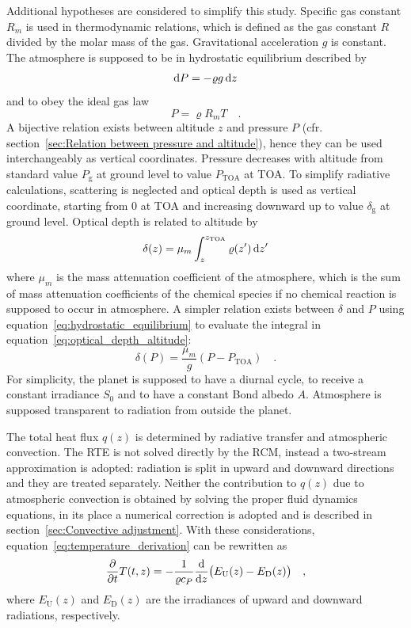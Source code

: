 \documentclass[a4paper,10pt,twocolumn,\classoptions]{article}
\newcommand{\zTOA}{z_\text{TOA}}
\newcommand{\PTOA}{P_\text{TOA}}
\begin{document}
Additional hypotheses are considered to simplify this study.
Specific gas constant $R_m$ is used in thermodynamic relations, which is defined as the gas constant $R$ divided by the molar mass of the gas.
Gravitational acceleration $g$ is constant.
The atmosphere is supposed to be in hydrostatic equilibrium described by
\begin{equation}
  \label{eq:hydrostatic_equilibrium}
  \odif{P} = - \varrho g \odif{z}
\end{equation}
and to obey the ideal gas law
\begin{equation}
  \label{eq:ideal_gas_law}
  P = \varrho R_m T
  \quad .
\end{equation}
A bijective relation exists between altitude $z$ and pressure $P$ (cfr. section~\ref{sec:Relation between pressure and altitude}), hence they can be used interchangeably as vertical coordinates. Pressure decreases with altitude from standard value $P_\text{g}$ at ground level to value $\PTOA$ at TOA.
To simplify radiative calculations, scattering is neglected and optical depth is used as vertical coordinate, starting from \num{0} at TOA and increasing downward up to value $\delta_\text{g}$ at ground level. Optical depth is related to altitude by
\begin{equation}
  \label{eq:optical_depth_altitude}
  \delta(z) = \mu_m \int_{z}^{\zTOA} \varrho(z') \odif{z'}
\end{equation}
where $\mu_m$ is the mass attenuation coefficient of the atmosphere, which is the sum of mass attenuation coefficients of the chemical species if no chemical reaction is supposed to occur in atmosphere. A simpler relation exists between $\delta$ and $P$ using equation~\eqref{eq:hydrostatic_equilibrium} to evaluate the integral in equation~\eqref{eq:optical_depth_altitude}:
\begin{equation}
  \label{eq:optical_depth_pressure}
  \delta(P) = \frac{\mu_m}{g} (P - \PTOA)
  \quad .
\end{equation}
For simplicity, the planet is supposed to have a diurnal cycle, to receive a constant irradiance $S_0$ and to have a constant Bond albedo $A$.
Atmosphere is supposed transparent to radiation from outside the planet.

The total heat flux $q(z)$ is determined by radiative transfer and atmospheric convection. The RTE is not solved directly by the RCM, instead a two-stream approximation is adopted: radiation is split in upward and downward directions and they are treated separately. Neither the contribution to $q(z)$ due to atmospheric convection is obtained by solving the proper fluid dynamics equations, in its place a numerical correction is adopted and is described in section~\ref{sec:Convective adjustment}.
With these considerations, equation~\eqref{eq:temperature_derivation} can be rewritten as
\begin{equation}
  \label{eq:temperature_time_derivative}
  \pdv*{T(t,z)}{t} = -\frac{1}{\varrho c_P} \odv*{\big( E_\text{U}(z) - E_\text{D}(z) \big)}{z}
  \quad ,
\end{equation}
where $E_\text{U}(z)$ and $E_\text{D}(z)$ are the irradiances of upward and downward radiations, respectively.
\end{document}
